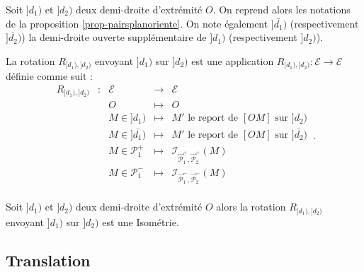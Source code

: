 \begin{defi}[Rotation]
    Soit $]d_1)$ et $]d_2)$ deux demi-droite d'extrémité $O$. On reprend alors les notations de la proposition \ref{prop-pairsplanoriente}. On note également $]\bar{d_1})$ (respectivement $]\bar{d_2})$) la demi-droite ouverte supplémentaire de $]d_1)$ (respectivement $]d_2)$). 

    La rotation $R_{]d_1),]d_2)}$ envoyant $]d_1)$ sur $]d_2)$ est une application $R_{]d_1),]d_2)} : \mathcal{E} \to \mathcal{E}$ définie comme suit :
    \begin{equation*}
        \begin{array}{ccccc}
        R_{]d_1),]d_2)} & : &  \mathcal{E} & \to &  \mathcal{E} \\
         & & O & \mapsto & O \\
         & & M\in ]d_1) & \mapsto & M' \text{ le report de } [OM] \text{ sur } ]d_2) \\
         & & M\in ]\bar{d_1}) & \mapsto & M' \text{ le report de } [OM] \text{ sur } ]\bar{d_2}) \\
        & & M\in \mathcal{P}_1^+ & \mapsto & \mathcal{I}_{\overrightarrow{\mathcal{P}}_1^+,\overrightarrow{\mathcal{P}}_2^+} (M) \\
        & & M\in  \mathcal{P}_1^- & \mapsto & \mathcal{I}_{\overrightarrow{\mathcal{P}}_1^-,\overrightarrow{\mathcal{P}}_2^-} (M) \\
        \end{array}\,.
    \end{equation*}
\end{defi}
\begin{thm}
    Soit $]d_1)$ et $]d_2)$ deux demi-droite d'extrémité $O$ alors la rotation $R_{]d_1),]d_2)}$ envoyant $]d_1)$ sur $]d_2)$ est une Isométrie. 
\end{thm}

        \subsection{Translation}

